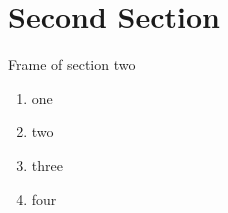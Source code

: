 \documentclass[
  english,            %
  aspectratio=169,    %
]{tumbeamer}
\begin{document}
\section{Second Section}
\begin{frame}{Frame of section two}
  \begin{enumerate}
    \item one
    \item two
    \item three
    \item four
  \end{enumerate}
\end{frame}
\end{document}
